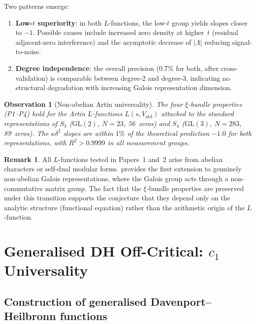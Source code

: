 \documentclass[11pt, a4paper]{article}
\theoremstyle{plain}
\newtheorem{observation}[theorem]{Observation}
\theoremstyle{definition}
\newtheorem{remark}{Remark}[section]
\newcommand{\abs}[1]{\left|#1\right|}
\newcommand{\Lam}{\Lambda}             %
\newcommand{\kap}{\kappa}             %
\begin{document}
Two patterns emerge:
\begin{enumerate}
  \item \textbf{Low-$t$ superiority}: in both $L$-functions, the
    low-$t$ group yields slopes closer to $-1$.  Possible causes
    include increased zero density at higher~$t$ (residual
    adjacent-zero interference) and the asymptotic decrease of
    $\abs{\Lam}$ reducing signal-to-noise.
  \item \textbf{Degree independence}: the overall precision (0.7\%
    for both, after cross-validation) is comparable between degree-2
    and degree-3, indicating no structural degradation with increasing
    Galois representation dimension.
\end{enumerate}

\begin{observation}[Non-abelian Artin universality]\label{obs:artin}
The four $\xi$-bundle properties \textnormal{(P1--P4)} hold for the
Artin $L$-functions $L(s, V_{\mathrm{std}})$ attached to the standard
representations of $S_{3}$ \textnormal{(}$\mathrm{GL}(2)$, $N=23$,
56~zeros\textnormal{)} and $S_{4}$ \textnormal{(}$\mathrm{GL}(3)$,
$N=283$, 89~zeros\textnormal{)}.  The $\kap\delta^{2}$ slopes are
within $1\%$ of the theoretical prediction $-1.0$ for both
representations, with $R^{2} > 0.9999$ in all measurement groups.
\end{observation}

\begin{remark}\label{rem:previous}
All $L$-functions tested in Papers~1 and~2 arise from abelian
characters or self-dual modular forms.
 provides the first extension to genuinely
non-abelian Galois representations, where the Galois group acts
through a non-commutative matrix group.  The fact that the $\xi$-bundle
properties are preserved under this transition supports the
conjecture that they depend only on the analytic structure
\textnormal{(}functional equation\textnormal{)} rather than the
arithmetic origin of the $L$-function.
\end{remark}


\section{Generalised DH Off-Critical: $c_{1}$ Universality}
\label{sec:dh-universal}

\subsection{Construction of generalised Davenport--Heilbronn functions}
\label{sec:dh-construction}
\end{document}
